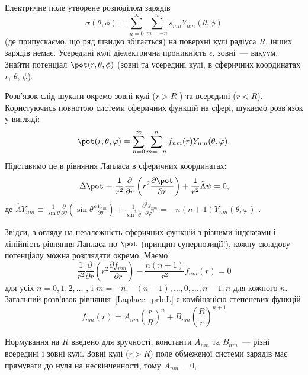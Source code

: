 \begin{problem}\label{prb:L}
Електричне поле утворене розподілом зарядів
\[
	\sigma(\theta, \phi) = \sum\limits_{n=0}^{\infty}\sum\limits_{m = -n}^ns_{mn}Y_{nm}(\theta, \phi)
\]
(де припускаємо, що ряд швидко збігається)  на поверхні кулі радіуса $R$, інших зарядів немає. Усередині кулі діелектрична проникність $\epsilon$, зовні~--- вакуум. Знайти потенціал  $\pot(r,\theta,\phi)$ (зовні та усередині кулі, в сферичних координатах  $r$, $\theta$, $\phi$).
\begin{solution}
	Розв'язок слід шукати окремо зовні кулі ($r >R$ ) та всередині ($r<R$). Користуючись повнотою системи сферичних функцій на сфері, шукаємо розв’язок у вигляді:
	\[
		\pot(r,\theta ,\varphi ) = \sum\limits_{n = 0}^\infty  {\sum\limits_{m =  - n}^n {{f_{nm}}(r){Y_{nm}}(\theta ,\varphi )} } .
	\]
	Підставимо це в рівняння Лапласа в сферичних координатах:
	\begin{equation}\label{Laplace_prb:L}
		\Delta \pot  \equiv \frac{1}{{{r^2}}}\frac{\partial }{{\partial r}}\left( {{r^2}\frac{{\partial \pot }}{{\partial r}}} \right) + \frac{1}{{{r^2}}}\hat \Lambda \psi  = 0,
	\end{equation}
	де \(\hat \Lambda {Y_{nm}} \equiv \frac{1}{{\sin \theta }}\frac{\partial }{{\partial \theta }}\left( {\sin \theta \frac{{\partial {Y_{nm}}}}{{\partial \theta }}} \right) + \frac{1}{{{{\sin }^2}\theta }}\frac{{{\partial ^2}{Y_{nm}}}}{{\partial {\varphi ^2}}} =  - n\left( {n + 1} \right){Y_{nm}}\left( {\theta ,\varphi } \right)\) .

	Звідси, з огляду на незалежність сферичних функцій з різними індексами і лінійність рівняння Лапласа по $\pot$  (принцип суперпозиції!), кожну складову потенціалу можна розглядати окремо. Маємо
	\[
		\frac{1}{{{r^2}}}\frac{\partial }{{\partial r}}\left( {{r^2}\frac{{\partial {f_{nm}}}}{{\partial r}}} \right) - \frac{{n\left( {n + 1} \right)}}{{{r^2}}}{f_{nm}}(r) = 0
	\]
	для усіх $n= 0,1,2,\ldots$ , і $m = -n, -(n-1), \ldots, 0, \ldots, n-1, n$  для кожного $n$.
	Загальний розв’язок рівняння~\eqref{Laplace_prb:L} є комбінацією степеневих функцій
	\begin{equation}\label{star_prb:L}
		f_{nm}(r) = A_{nm}{\left( {\frac{r}{R}} \right)^n} + {B_{nm}}{\left( {\frac{R}{r}} \right)^{n + 1}}
	\end{equation}

	Нормування на $R$ введено для зручності, константи $A_{nm}$ та $B_{nm}$~--- різні всередині і зовні кулі.
	Зовні кулі ($r >R$) поле обмеженої системи зарядів має прямувати до нуля на нескінченності, тому $A_{nm} = 0$, 


\end{solution}
\end{problem}
